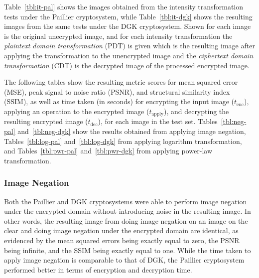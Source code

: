 Table~\ref{tbl:it-pal} shows the images obtained from the intensity transformation tests under the Paillier cryptosystem, while Table~\ref{tbl:it-dgk} shows the resulting images from the same tests under the DGK cryptosystem. Shown for each image is the original unecrypted image, and for each intensity transformation the \textit{plaintext domain transformation} (PDT) is given which is the resulting image after applying the transformation to the unencrypted image and the \textit{ciphertext domain transformation} (CDT) is the decrypted image of the processed encrypted image.

The following tables show the resulting metric scores for mean squared error (MSE), peak signal to noise ratio (PSNR), and structural similarity index (SSIM), as well as time taken (in seconds) for encrypting the input image ($t_\text{enc}$), applying an operation to the encrypted image ($t_\text{apply}$), and decrypting the resulting encrypted image ($t_\text{dec}$), for each image in the test set. Tables~\ref{tbl:neg-pal} and~\ref{tbl:neg-dgk} show the results obtained from applying image negation, Tables~\ref{tbl:log-pal} and~\ref{tbl:log-dgk} from applying logarithm transformation, and Tables~\ref{tbl:pwr-pal} and~\ref{tbl:pwr-dgk} from applying power-law transformation.

\subsubsection{Image Negation}
Both the Paillier and DGK cryptosystems were able to perform image negation under the encrypted domain without introducing noise in the resulting image. In other words, the resulting image from doing image negation on an image on the clear and doing image negation under the encrypted domain are identical, as evidenced by the mean squared errors being exactly equal to zero, the PSNR being infinite, and the SSIM being exactly equal to one. While the time taken to apply image negation is comparable to that of DGK, the Paillier cryptosystem performed better in terms of encryption and decryption time.

